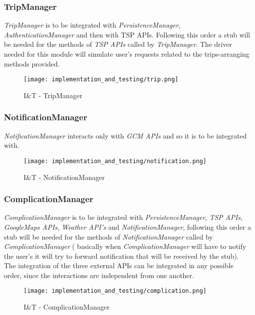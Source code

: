 \subsubsection{TripManager}
\textit{TripManager} is to be integrated with \textit{PersistenceManager}, \textit{AuthenticationManager} and then with TSP APIs. Following this order a stub will be needed for the methods of \textit{TSP APIs} called by \textit{TripManager}. The driver needed for this module will simulate user's requests related to the trips-arranging methods provided.
\begin{figure}[H]
	\begin{center}
		\texttt{[image: implementation\_and\_testing/trip.png]}
	\end{center}
	\caption{I\&T - TripManager}
\end{figure}

\subsubsection{NotificationManager}
\textit{NotificationManager} interacts only with \textit{GCM APIs} and so it is to be integrated with.
\begin{figure}[H]
	\begin{center}
		\texttt{[image: implementation\_and\_testing/notification.png]}
	\end{center}
	\caption{I\&T - NotificationManager}
\end{figure}

\subsubsection{ComplicationManager}
\textit{ComplicationManager} is to be integrated with \textit{PersistenceManager}, \textit{TSP APIs}, \textit{GoogleMaps APIs}, \textit{Weather API's} and \textit{NotificationManager}, following this order a stub will be needed for the methods of \textit{NotificationManager} called by \textit{ComplicationManager} ( basically when \textit{ComplicationManager} will have to notify the user's it will try to forward notification that will be received by the stub).
The integration of the three external APIs can be integrated in any possible order, since the interactions are independent from one another.
\begin{figure}[H]
	\begin{center}
		\texttt{[image: implementation\_and\_testing/complication.png]}
	\end{center}
	\caption{I\&T - ComplicationManager}
\end{figure}

